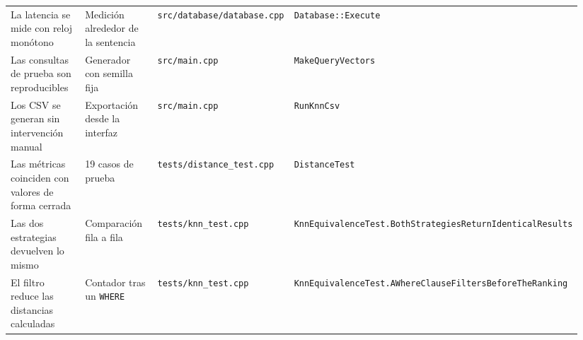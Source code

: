 \documentclass[11pt,a4paper]{article}
\begin{document}
\begin{landscape}
\begin{longtable}[]{@{}L{0.20\linewidth}L{0.18\linewidth}L{0.24\linewidth}L{0.32\linewidth}@{}}
La latencia se mide con reloj monótono & Medición alrededor de la
sentencia & \texttt{src/database/database.cpp} &
\texttt{Database::Execute} \\
Las consultas de prueba son reproducibles & Generador con semilla fija &
\texttt{src/main.cpp} & \texttt{MakeQueryVectors} \\
Los CSV se generan sin intervención manual & Exportación desde la
interfaz & \texttt{src/main.cpp} & \texttt{RunKnnCsv} \\
Las métricas coinciden con valores de forma cerrada & 19 casos de prueba
& \texttt{tests/distance\_test.cpp} & \texttt{DistanceTest} \\
Las dos estrategias devuelven lo mismo & Comparación fila a fila &
\texttt{tests/knn\_test.cpp} &
\texttt{KnnEquivalenceTest.BothStrategiesReturnIdenticalResults} \\
El filtro reduce las distancias calculadas & Contador tras un
\texttt{WHERE} & \texttt{tests/knn\_test.cpp} &
\texttt{KnnEquivalenceTest.AWhereClauseFiltersBeforeTheRanking} \\
\end{longtable}
\end{landscape}
\end{document}
